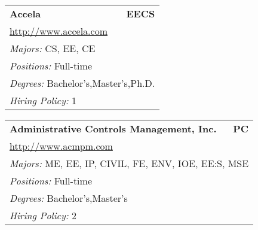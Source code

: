 \documentclass[twoside]{article}
\begin{document}
    \startcompanysection
    \begin{center}\begin{multicols}{3}
    \begin{FlushLeft}
    \begin{minipage}{.9\columnwidth}\begin{tabularx}{.95\columnwidth}{Xr}
                 {\Large\bf Accela} & {\Large\bf EECS}\\
    \multicolumn{2}{p{.95\columnwidth}}{\url{http://www.accela.com}}\\
    \multicolumn{2}{p{.95\columnwidth}}{\emph{Majors:} CS, EE, CE}\\
    \multicolumn{2}{p{.95\columnwidth}}{\emph{Positions:} Full-time}\\
    \multicolumn{2}{p{.95\columnwidth}}{\emph{Degrees:} Bachelor's,Master's,Ph.D.}\\
    \multicolumn{2}{p{.95\columnwidth}}{\emph{Hiring Policy:} 1}\\
    \end{tabularx}
    
\end{minipage}
 
\begin{minipage}{.9\columnwidth}\begin{tabularx}{.95\columnwidth}{Xr}
                 {\Large\bf Administrative Controls Management, Inc.} & {\Large\bf PC}\\
    \multicolumn{2}{p{.95\columnwidth}}{\url{http://www.acmpm.com}}\\
    \multicolumn{2}{p{.95\columnwidth}}{\emph{Majors:} ME, EE, IP, CIVIL, FE, ENV, IOE, EE:S, MSE}\\
    \multicolumn{2}{p{.95\columnwidth}}{\emph{Positions:} Full-time}\\
    \multicolumn{2}{p{.95\columnwidth}}{\emph{Degrees:} Bachelor's,Master's}\\
    \multicolumn{2}{p{.95\columnwidth}}{\emph{Hiring Policy:} 2}\\
    \end{tabularx}
    

\end{minipage}
\end{FlushLeft}
\end{multicols}
\end{center}
\end{document}
